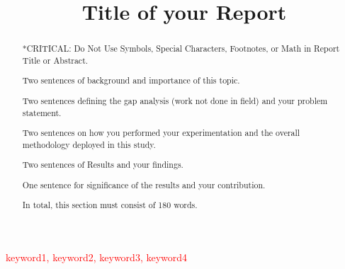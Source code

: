 \documentclass[conference]{IEEEtran}
\begin{document}
\title{Title of your Report\\
}

\author{
\and
{}
}

\maketitle

\begin{abstract}
*CRITICAL: Do Not Use Symbols, Special Characters, Footnotes, or Math in Report Title or Abstract.

Two sentences of background and importance of this topic.

Two sentences defining the gap analysis (work not done in field) and your problem statement.

Two sentences on how you performed your experimentation and the overall methodology deployed in this study.

Two sentences of Results and your findings.

One sentence for significance of the results and your contribution.

In total, this section must consist of 180 words.

\end{abstract}

\begin{IEEEkeywords}
\textcolor{red}{keyword1, keyword2, keyword3, keyword4}
\end{IEEEkeywords}
\end{document}
